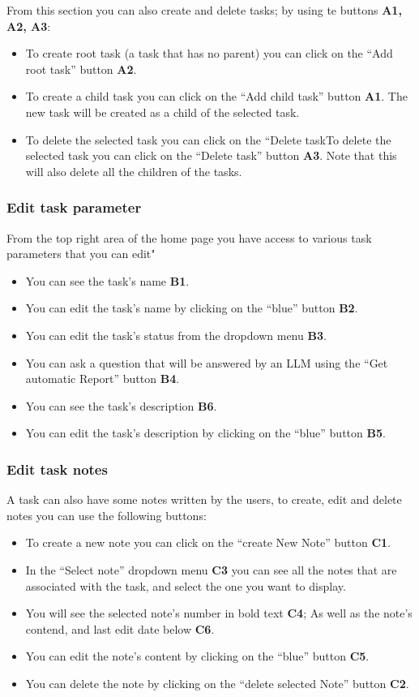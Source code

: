 \documentclass{article}
\begin{document}
From this section you can also create and delete tasks; by using te buttons \textbf{A1, A2, A3}:
\begin{itemize}
  \item To create root task (a task that has no parent) you can click on the ``Add root task'' button \textbf{A2}.
  \item To create a child task you can click on the ``Add child task'' button \textbf{A1}. The new task will be created as a child of the selected task. 
  \item To delete the selected task you can click on the ``Delete taskTo delete the selected task you can click on the ``Delete task'' button \textbf{A3}.
Note that this will also delete all the children of the tasks.
\end{itemize}
\subsubsection{Edit task parameter}
From the top right area of the home page you have access to various task parameters that you can edit"
\begin{itemize}
  \item You can see the task's name \textbf{B1}.
  \item You can edit the task's name by clicking on the ``blue'' button \textbf{B2}.
  \item You can edit the task's status from the dropdown menu \textbf{B3}.
  \item You can ask a question that will be answered by an LLM using the ``Get automatic Report'' button \textbf{B4}.
  \item You can see the task's description \textbf{B6}.
  \item You can edit the task's description by clicking on the ``blue'' button \textbf{B5}.
\end{itemize}
\subsubsection{Edit task notes}

A task can also have some notes written by the users, to create, edit and delete notes you can use the following buttons:

\begin{itemize}
  \item To create a new note you can click on the ``create New Note'' button \textbf{C1}.
  \item In the ``Select note'' dropdown menu \textbf{C3} you can see all the notes that are associated with the task, and select
  the one you want to display.
  \item You will see the selected note's number in bold text \textbf{C4}; As well as the
  note's contend, and last edit date below \textbf{C6}.
  \item You can edit the note's content by clicking on the ``blue'' button \textbf{C5}.
  \item You can delete the note by clicking on the ``delete selected Note'' button \textbf{C2}.
\end{itemize}
\end{document}
